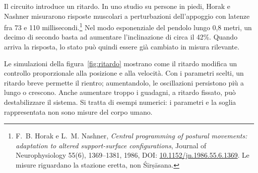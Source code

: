 \documentclass[11pt,a4paper,twoside=false,headinclude,footinclude]{scrartcl}
\begin{document}
Il circuito introduce un ritardo. In uno studio su persone in piedi, Horak e Nashner misurarono risposte muscolari a perturbazioni dell'appoggio con latenze fra 73 e 110 millisecondi.\footnote{F.~B. Horak e L.~M. Nashner, \emph{Central programming of postural movements: adaptation to altered support-surface configurations}, Journal of Neurophysiology 55(6), 1369--1381, 1986, DOI: \href{https://doi.org/10.1152/jn.1986.55.6.1369}{10.1152/jn.1986.55.6.1369}. Le misure riguardano la stazione eretta, non Śīrṣāsana.} Nel modo esponenziale del pendolo lungo 0,8 metri, un decimo di secondo basta ad aumentare l'inclinazione di circa il 42\%. Quando arriva la risposta, lo stato può quindi essere già cambiato in misura rilevante.

Le simulazioni della figura~\ref{fig:ritardo} mostrano come il ritardo modifica un controllo proporzionale alla posizione e alla velocità. Con i parametri scelti, un ritardo breve permette il rientro; aumentandolo, le oscillazioni persistono più a lungo o crescono. Anche aumentare troppo i guadagni, a ritardo fissato, può destabilizzare il sistema. Si tratta di esempi numerici: i parametri e la soglia rappresentata non sono misure del corpo umano.
\end{document}
